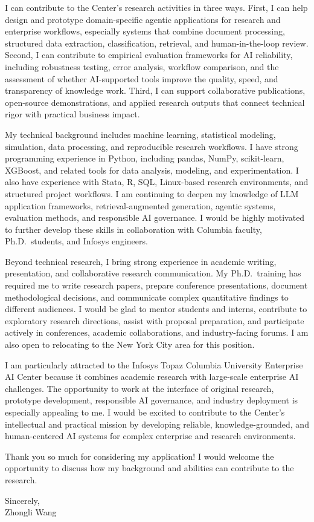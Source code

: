 \documentclass[11pt]{article}
\begin{document}
I can contribute to the Center's research activities in three ways. First, I can help design and prototype domain-specific agentic applications for research and enterprise workflows, especially systems that combine document processing, structured data extraction, classification, retrieval, and human-in-the-loop review. Second, I can contribute to empirical evaluation frameworks for AI reliability, including robustness testing, error analysis, workflow comparison, and the assessment of whether AI-supported tools improve the quality, speed, and transparency of knowledge work. Third, I can support collaborative publications, open-source demonstrations, and applied research outputs that connect technical rigor with practical business impact.

My technical background includes machine learning, statistical modeling, simulation, data processing, and reproducible research workflows. I have strong programming experience in Python, including pandas, NumPy, scikit-learn, XGBoost, and related tools for data analysis, modeling, and experimentation. I also have experience with Stata, R, SQL, Linux-based research environments, and structured project workflows. I am continuing to deepen my knowledge of LLM application frameworks, retrieval-augmented generation, agentic systems, evaluation methods, and responsible AI governance. I would be highly motivated to further develop these skills in collaboration with Columbia faculty, Ph.D.\ students, and Infosys engineers.

Beyond technical research, I bring strong experience in academic writing, presentation, and collaborative research communication. My Ph.D.\ training has required me to write research papers, prepare conference presentations, document methodological decisions, and communicate complex quantitative findings to different audiences. I would be glad to mentor students and interns, contribute to exploratory research directions, assist with proposal preparation, and participate actively in conferences, academic collaborations, and industry-facing forums. I am also open to relocating to the New York City area for this position.

I am particularly attracted to the Infosys Topaz Columbia University Enterprise AI Center because it combines academic research with large-scale enterprise AI challenges. The opportunity to work at the interface of original research, prototype development, responsible AI governance, and industry deployment is especially appealing to me. I would be excited to contribute to the Center's intellectual and practical mission by developing reliable, knowledge-grounded, and human-centered AI systems for complex enterprise and research environments.

Thank you so much for considering my application! I would welcome the opportunity to discuss how my background and abilities can contribute to the research.

\vspace{0.15cm}

\noindent Sincerely, \\[0.8cm]
\noindent Zhongli Wang
\end{document}
